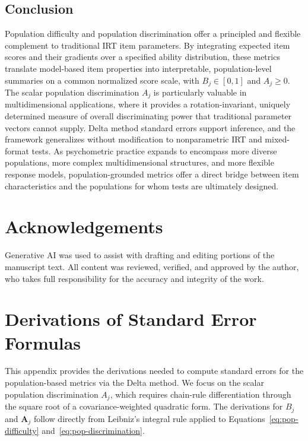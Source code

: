 \documentclass[man, 12pt, floatsintext]{apa7}
\begin{document}
\subsection{Conclusion}

Population difficulty and population discrimination offer a principled and flexible complement to traditional IRT item parameters. By integrating expected item scores and their gradients over a specified ability distribution, these metrics translate model-based item properties into interpretable, population-level summaries on a common normalized score scale, with $B_j \in [0, 1]$ and $A_j \geq 0$. The scalar population discrimination $A_j$ is particularly valuable in multidimensional applications, where it provides a rotation-invariant, uniquely determined measure of overall discriminating power that traditional parameter vectors cannot supply. Delta method standard errors support inference, and the framework generalizes without modification to nonparametric IRT and mixed-format tests. As psychometric practice expands to encompass more diverse populations, more complex multidimensional structures, and more flexible response models, population-grounded metrics offer a direct bridge between item characteristics and the populations for whom tests are ultimately designed.


\printbibliography

\section*{Acknowledgements}
Generative AI was used to assist with drafting and editing portions of the manuscript text. All content was reviewed, verified, and approved by the author, who takes full responsibility for the accuracy and integrity of the work.

\appendix
\section{Derivations of Standard Error Formulas}\label{app:se-derivations}

This appendix provides the derivations needed to compute standard errors for the population-based metrics via the Delta method. We focus on the scalar population discrimination $A_j$, which requires chain-rule differentiation through the square root of a covariance-weighted quadratic form. The derivations for $B_j$ and $\mathbf{A}_j$ follow directly from Leibniz's integral rule applied to Equations~\eqref{eq:pop-difficulty} and~\eqref{eq:pop-discrimination}.
\end{document}
